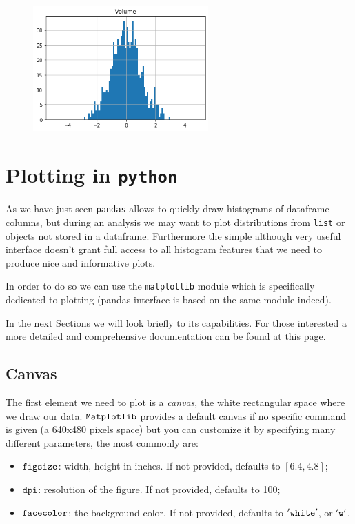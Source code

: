\begin{figure}[h]
\centering
  \includegraphics[width=0.6\textwidth]{figures/Untitled_41_1.png}
\end{figure}
    
\clearpage
\section{Plotting in \texttt{python}}\label{plotting-in-python}

As we have just seen \texttt{pandas} allows to quickly draw histograms of dataframe columns, but during an analysis we may want to plot distributions from \texttt{list} or objects not stored in a dataframe. Furthermore the simple although very useful interface doesn't grant full access to all histogram features that we need to produce nice and informative plots.

In order to do so we can use the \texttt{matplotlib} module which is specifically dedicated to plotting (pandas interface is based on the same module indeed). 

In the next Sections we will look briefly to its capabilities. For those interested a more detailed and comprehensive documentation can be found at
\href{https://matplotlib.org}{this page}.

\subsection{Canvas}\label{canvas}

The first element we need to plot is a \emph{canvas}, the white
rectangular space where we draw our data. \(\tt{Matplotlib}\) provides a
default canvas if no specific command is given (a 640x480 pixels space)
but you can customize it by specifying many different parameters, the
most commonly are:

\begin{itemize}
	\tightlist
	\item
	\(\tt{figsize}\): width, height in inches. If not provided, defaults
	to \([6.4, 4.8]\);
	\item
	\(\tt{dpi}\): resolution of the figure. If not provided, defaults to
	100;
	\item
	\(\tt{facecolor}\): the background color. If not provided, defaults to
	\(\tt{'white'}\), or \(\tt{'w'}\).
\end{itemize}

